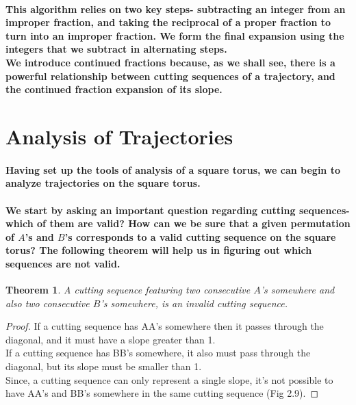 \documentclass{report}
\newtheorem{theorem}{Theorem}[chapter]
\begin{document}
\paragraph{This algorithm relies on two key steps- subtracting an integer from an improper fraction, and taking the reciprocal of a proper fraction to turn into an improper fraction. We form the final expansion using the integers that we subtract in alternating steps.
\\
We introduce continued fractions because, as we shall see, there is a powerful relationship between cutting sequences of a trajectory, and the continued fraction expansion of its slope.}

\section{Analysis of Trajectories}

\paragraph{Having set up the tools of analysis of a square torus, we can begin to analyze trajectories on the square torus. 
\\ \\
We start by asking an important question regarding cutting sequences- which of them are valid? How can we be sure that a given permutation of $A$’s and $B$’s corresponds to a valid cutting sequence on the square torus? The following theorem will help us in figuring out which sequences are not valid.}

\begin{theorem}
A cutting sequence featuring two consecutive $A$’s somewhere and also two consecutive $B$’s somewhere, is an invalid cutting sequence.
\end{theorem}

\begin{proof}
If a cutting sequence has AA’s somewhere then it passes through the diagonal, and it must have a slope greater than 1. \\ 
If a cutting sequence has BB’s somewhere, it also must pass through the diagonal, but its slope must be smaller than 1. \\ 
Since, a cutting sequence can only represent a single slope, it's not possible to have AA’s and BB’s somewhere in the same cutting sequence (Fig 2.9).
\end{proof}
\end{document}
